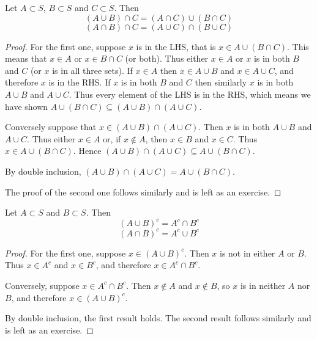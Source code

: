 \begin{proposition}
Let $A\subset S$, $B\subset S$ and $C\subset S$. Then
\begin{equation}
(A\cup B)\cap C = (A\cap C)\cup(B\cap C)
\end{equation}
\begin{equation}
(A\cap B)\cap C = (A\cup C)\cap(B\cup C)
\end{equation}
\end{proposition}
\begin{proof}
For the first one, suppose $x$ is in the LHS, that is $x \in A\cup(B \cap C)$. This means that $x \in A$ or $x \in B \cap C$ (or both). Thus either $x \in A$ or $x$ is in both $B$ and $C$ (or $x$ is in all three sets). If $x \in A$ then $x \in A\cup B$ and $x \in A\cup C$, and therefore $x$ is in the RHS. If $x$ is in both $B$ and $C$ then similarly $x$ is in both $A\cup B$ and $A\cup C$. Thus every element of the LHS is in the RHS, which means we have shown $A \cup (B \cap C) \subseteq (A \cup B) \cap (A \cup C)$.

Conversely suppose that $x \in (A \cup B) \cap (A \cup C)$. Then $x$ is in both $A \cup B$ and $A\cup C$. Thus either $x \in A$ or, if $x \notin A$, then $x \in B$ and $x \in C$. Thus $x \in A\cup(B \cap C)$. Hence $(A \cup B) \cap (A \cup C) \subseteq A \cup (B \cap C)$.

By double inclusion, $(A \cup B) \cap (A \cup C) = A \cup (B \cap C)$.

The proof of the second one follows similarly and is left as an exercise.
\end{proof}

\begin{proposition}
Let $A \subset S$ and $B \subset S$. Then
\begin{equation}
(A \cup B)^c = A^c \cap B^c
\end{equation}
\begin{equation}
(A \cap B)^c = A^c \cup B^c
\end{equation}
\end{proposition}
\begin{proof}
For the first one, suppose $x \in (A \cup B)^c$. Then $x$ is not in either $A$ or $B$. Thus $x \in A^c$ and $x \in B^c$, and therefore $x \in A^c \cap B^c$. 

Conversely, suppose $x \in A^c \cap B^c$. Then $x \notin A$ and $x \notin B$, so $x$ is in neither $A$ nor $B$, and therefore $x \in (A \cup B)^c$.

By double inclusion, the first result holds. The second result follows similarly and is left as an exercise.
\end{proof}

